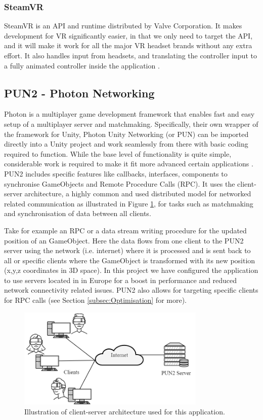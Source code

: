 \subsubsection{SteamVR}
SteamVR is an API and runtime distributed by Valve Corporation. It makes development for VR significantly easier, in that we only need to target the API, and it will make it work for all the major VR headset brands without any extra effort. It also handles input from headsets, and translating the controller input to a fully animated controller inside the application \cite{steamVR}\cite{steamVRAPI}.

\subsection{PUN2 - Photon Networking}
\label{section:pun2}
Photon is a multiplayer game development framework that enables fast and easy setup of a multiplayer server and matchmaking. Specifically, their own wrapper of the framework for Unity, Photon Unity Networking (or PUN) can be imported directly into a Unity project and work seamlessly from there with basic coding required to function. While the base level of functionality is quite simple, considerable work is required to make it fit more advanced certain applications \cite{PUN}. PUN2 includes specific features like callbacks, interfaces, components to synchronise GameObjects and Remote Procedure Calls (RPC). It uses the client-server architecture, a highly common and used distributed model for networked related communication as illustrated in Figure \ref{fig:ClientServer}, for tasks such as matchmaking and synchronisation of data between all clients. 

Take for example an RPC or a data stream writing procedure for the updated position of an GameObject. Here the data flows from one client to the PUN2 server using the network (i.e. internet) where it is processed and is sent back to all or specific clients where the GameObject is transformed with its new position (x,y,z coordinates in 3D space). In this project we have configured the application to use servers located in in Europe for a boost in performance and reduced network connectivity related issues. PUN2 also allows for targeting specific clients for RPC calls (see Section \ref{subsec:Optimisation} for more). 

\begin{figure}[!ht]
    \centering
    \includegraphics[width=0.8\textwidth]{./fig/background/ClientServer.png}
    \caption{Illustration of client-server architecture used for this application. }
    \label{fig:ClientServer}
\end{figure}

